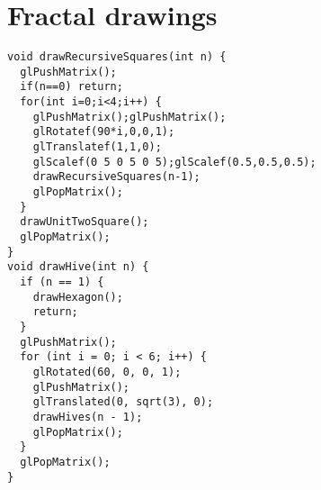 \documentclass[8pt,twocolumn]{extarticle}
\begin{document}
\section*{Fractal drawings}
\begin{lstlisting}
void drawRecursiveSquares(int n) {
  glPushMatrix();
  if(n==0) return;
  for(int i=0;i<4;i++) {
    glPushMatrix();glPushMatrix();
    glRotatef(90*i,0,0,1);
    glTranslatef(1,1,0);
    glScalef(0 5 0 5 0 5);glScalef(0.5,0.5,0.5);
    drawRecursiveSquares(n-1);
    glPopMatrix();
  }
  drawUnitTwoSquare();
  glPopMatrix();
}
void drawHive(int n) {
  if (n == 1) {
    drawHexagon();
    return;
  }
  glPushMatrix();
  for (int i = 0; i < 6; i++) {
    glRotated(60, 0, 0, 1);
    glPushMatrix();
    glTranslated(0, sqrt(3), 0);
    drawHives(n - 1);
    glPopMatrix();
  }
  glPopMatrix();
}
\end{lstlisting}
\end{document}
